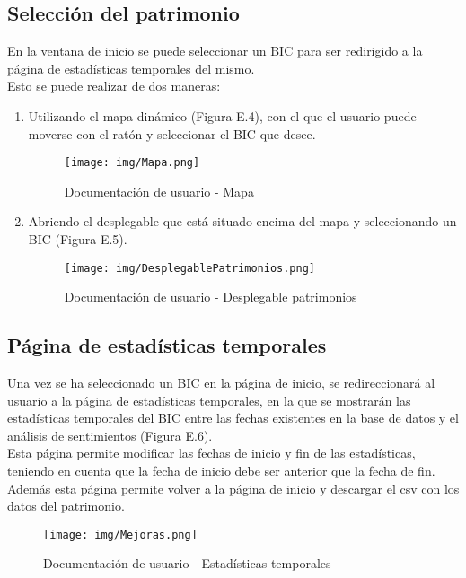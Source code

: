 \subsection{Selección del patrimonio}
En la ventana de inicio se puede seleccionar un BIC para ser redirigido a la página de estadísticas temporales del mismo.\\
Esto se puede realizar de dos maneras:
\begin{enumerate}
    \item Utilizando el mapa dinámico (Figura E.4), con el que el usuario puede moverse con el ratón y seleccionar el BIC que desee.
    \begin{figure}[h!]
        \centering
        \texttt{[image: img/Mapa.png]} \\
        \caption{Documentación de usuario - Mapa}
        \label{Documentación de usuario - Mapa}
    \end{figure}
    \item Abriendo el desplegable que está situado encima del mapa y seleccionando un BIC (Figura E.5).
    \begin{figure}[h!]
        \centering
        \texttt{[image: img/DesplegablePatrimonios.png]} \\
        \caption{Documentación de usuario - Desplegable patrimonios}
        \label{Documentación de usuario - Desplegable patrimonios}
    \end{figure}
\end{enumerate}
\subsection{Página de estadísticas temporales}
Una vez se ha seleccionado un BIC en la página de inicio, se redireccionará al usuario a la página de estadísticas temporales, en la que se mostrarán las estadísticas temporales del BIC entre las fechas existentes en la base de datos y el análisis de sentimientos (Figura E.6).\\
Esta página permite modificar las fechas de inicio y fin de las estadísticas, teniendo en cuenta que la fecha de inicio debe ser anterior que la fecha de fin.
Además esta página permite volver a la página de inicio y descargar el csv con los datos del patrimonio.
\begin{figure}[h!]
    \centering
    \texttt{[image: img/Mejoras.png]} 
    \caption{Documentación de usuario - Estadísticas temporales}
    \label{Documentación de usuario - Estadísticas temporales}
\end{figure}

